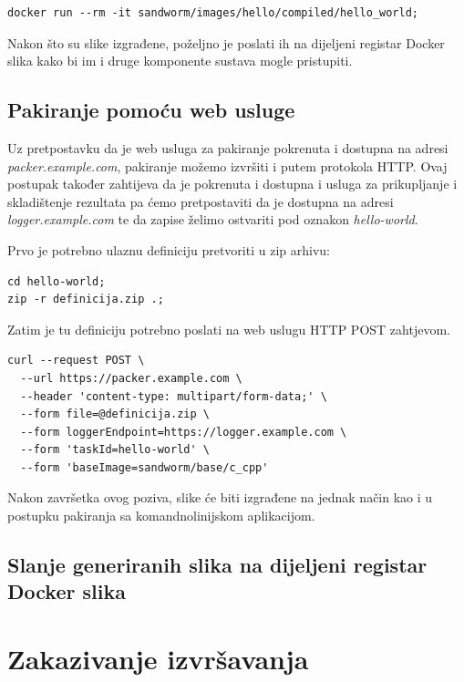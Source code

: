 \documentclass[times, utf8, zavrsni]{fer}
\begin{document}
{{\begin{appendices}
\begin{lstlisting}
docker run --rm -it sandworm/images/hello/compiled/hello_world;
\end{lstlisting}

Nakon što su slike izgrađene, poželjno je poslati ih na dijeljeni registar Docker slika kako bi im i druge komponente sustava mogle pristupiti.

\subsection{Pakiranje pomoću web usluge}

Uz pretpostavku da je web usluga za pakiranje pokrenuta i dostupna na adresi {\textit{packer.example.com}}, pakiranje možemo izvršiti i putem protokola HTTP. Ovaj postupak također zahtijeva da je pokrenuta i dostupna i usluga za prikupljanje i skladištenje rezultata pa ćemo pretpostaviti da je dostupna na adresi {\textit{logger.example.com}} te da zapise želimo ostvariti pod oznakon {\textit{hello-world}}.

Prvo je potrebno ulaznu definiciju pretvoriti u zip arhivu:

\begin{lstlisting}
cd hello-world;
zip -r definicija.zip .;
\end{lstlisting}

Zatim je tu definiciju potrebno poslati na web uslugu HTTP POST zahtjevom.

\begin{lstlisting}
curl --request POST \
  --url https://packer.example.com \
  --header 'content-type: multipart/form-data;' \
  --form file=@definicija.zip \
  --form loggerEndpoint=https://logger.example.com \
  --form 'taskId=hello-world' \
  --form 'baseImage=sandworm/base/c_cpp'
\end{lstlisting}

Nakon završetka ovog poziva, slike će biti izgrađene na jednak način kao i u postupku pakiranja sa komandnolinijskom aplikacijom.

\subsection{Slanje generiranih slika na dijeljeni registar Docker slika}

\section{Zakazivanje izvršavanja}


\end{appendices}}}
\end{document}
